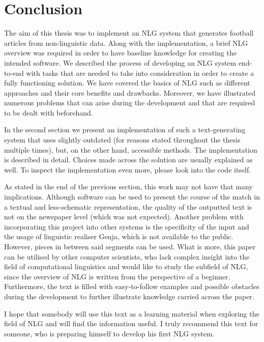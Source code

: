 \chapter*{Conclusion}
The aim of this thesis was to implement an NLG system that generates football articles from non-linguistic data. Along with the implementation, a brief NLG overview was required in order to have baseline knowledge for creating the intended software. We described the process of developing an NLG system end-to-end with tasks that are needed to take into consideration in order to create a fully functioning solution. We have covered the basics of NLG such as different approaches and their core benefits and drawbacks. Moreover, we have illustrated numerous problems that can arise during the development and that are required to be dealt with beforehand.

In the second section we present an implementation of such a text-generating system that uses slightly outdated (for reasons stated throughout the thesis multiple times), but, on the other hand, accessible methods. The implementation is described in detail. Choices made across the solution are usually explained as well. To inspect the implementation even more, please look into the code itself.

As stated in the end of the previous section, this work may not have that many implications. Although software can be used to present the course of the match in a textual and less-schematic representation, the quality of the outputted text is not on the newspaper level (which was not expected). Another problem with incorporating this project into other systems is the specificity of the input and the usage of linguistic realiser Genja, which is not available to the public. However, pieces in between said segments can be used. What is more, this paper can be utilised by other computer scientists, who lack complex insight into the field of computational linguistics and would like to study the subfield of NLG, since the overview of NLG is written from the perspective of a beginner. Furthermore, the text is filled with easy-to-follow examples and possible obstacles during the development to further illustrate knowledge carried across the paper. 

I hope that somebody will use this text as a learning material when exploring the field of NLG and will find the information useful. I truly recommend this text for someone, who is preparing himself to develop his first NLG system.
